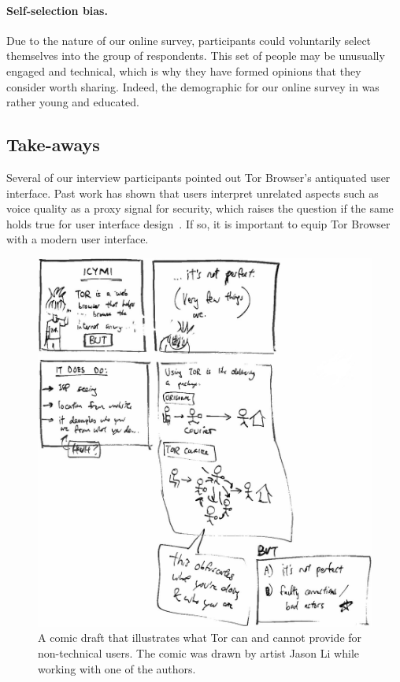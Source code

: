 \paragraph{Self-selection bias.}
Due to the nature of our online survey, participants could voluntarily select
themselves into the group of respondents.  This set of people may be unusually
engaged and technical, which is why they have formed opinions that they
consider worth sharing.  Indeed, the demographic for our online survey in
 was rather young and educated.

\subsection{Take-aways}
\label{sec:take-aways}

Several of our interview participants pointed out Tor Browser's antiquated user
interface.  Past work has shown that users interpret unrelated aspects such as
voice quality as a proxy signal for security, which raises the question if the
same holds true for user interface design~\cite[\S~IV.A]{Abu-Salma2017a}.  If
so, it is important to equip Tor Browser with a modern user interface.

\begin{figure}[t]
    \centering
    \includegraphics[width=\linewidth]{figures/tor-comic.jpg}
    \caption{A comic draft that illustrates what Tor can and cannot provide for
        non-technical users.  The comic was drawn by artist Jason Li while
        working with one of the authors.}
    \label{fig:tor-comic}
\end{figure}

